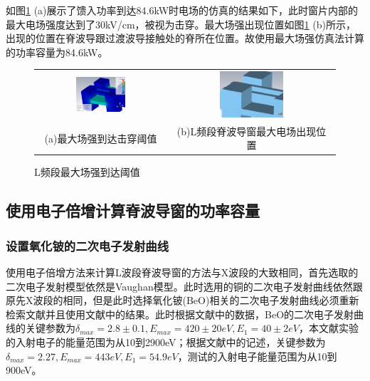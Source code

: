 \documentclass[master]{thesis-uestc}
\begin{document}
如图\ref{fig:L频段最大场强到达阈值} (a)展示了馈入功率到达84.6kW时电场的仿真的结果如下，此时窗片内部的最大电场强度达到了30kV/cm，被视为击穿。最大场强出现位置如图\ref{fig:L频段最大场强到达阈值} (b)所示，出现的位置在脊波导跟过渡波导接触处的脊所在位置。故使用最大场强仿真法计算的功率容量为84.6kW。
\begin{figure}[!htb]
    \small
    \centering
    \begin{tabular}{@{\ }c@{\ }c}
        \includegraphics[width=0.4\textwidth]{pic/chapter4/L频段最大场强到达阈值.png} & 
        \hspace{5pt}
        \includegraphics[width=0.4\textwidth]{pic/chapter4/L频段最大场强所在位置.png}     \\
        \mbox{\small (a)最大场强到达击穿阈值}                                                                               & 
        \mbox{\small (b)L频段脊波导窗最大电场出现位置}                                                                                  \\
    \end{tabular}
    \caption{L频段最大场强到达阈值}
    \label{fig:L频段最大场强到达阈值}
\end{figure}


\subsection{使用电子倍增计算脊波导窗的功率容量}

\subsubsection{设置氧化铍的二次电子发射曲线}
使用电子倍增方法来计算L波段脊波导窗的方法与X波段的大致相同，首先选取的二次电子发射模型依然是Vaughan模型。此时选用的铜的二次电子发射曲线依然跟原先X波段的相同，但是此时选择氧化铍(BeO)相关的二次电子发射曲线必须重新检索文献并且使用文献中的结果。此时根据文献\cite{shih_1994_beosee}中的数据，BeO的二次电子发射曲线的关键参数为$\delta_{max}=2.8 \pm 0.1, E_{max}=420 \pm 20 eV, E_1 = 40 \pm 2 eV$，本文献实验的入射电子的能量范围为从10到2900eV；根据文献\cite{ritz_1988_secondary}中的记述，关键参数为$\delta_{max}=2.27, E_{max}= 443  eV, E_1 =54.9 eV$，测试的入射电子能量范围为从10到900eV。
\end{document}
